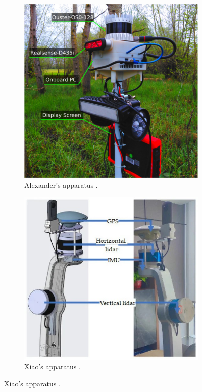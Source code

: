 \begin{figure}[H]
    \centering
    \begin{subfigure}{0.35\textwidth}
        \includegraphics[width=0.8\linewidth]{images/background/alexandar_apparatus.jpg}
        \caption{Alexander's apparatus \cite{proudman_online_2021}.}
        \label{fig: Alexander apparatus}
    \end{subfigure}
    \begin{subfigure}{0.35\textwidth}
        \includegraphics[width=0.875\linewidth]{images/background/xiao_apparatus.jpg}
        \caption{Xiao's apparatus \cite{xiao_high-precision_2022}.}

\end{subfigure}
\end{figure}
